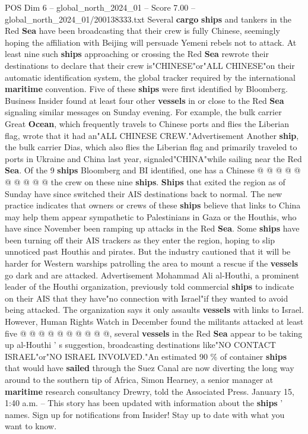 \begin{textsample}{POS Dim 6 – global\_north\_2024\_01 – Score 7.00 – global\_north\_2024\_01/200138333.txt}  \label{ex:f6_pos_119}
Several \textbf{cargo} \textbf{ships} and tankers in the Red \textbf{Sea} have been broadcasting that their crew is fully Chinese, seemingly hoping the affiliation with Beijing will persuade Yemeni rebels not to attack.
At least nine such \textbf{ships} approaching or crossing the Red \textbf{Sea} rewrote their destinations to declare that their crew is"CHINESE"or"ALL CHINESE"on their automatic identification system, the global tracker required by the international \textbf{maritime} convention.
Five of these \textbf{ships} were first identified by Bloomberg.
Business Insider found at least four other \textbf{vessels} in or close to the Red \textbf{Sea} signaling similar messages on Sunday evening.
For example, the bulk carrier Great \textbf{Ocean}, which frequently travels to Chinese ports and flies the Liberian flag, wrote that it had an"ALL CHINESE CREW."Advertisement Another \textbf{ship}, the bulk carrier Dias, which also flies the Liberian flag and primarily traveled to ports in Ukraine and China last year, signaled"CHINA"while sailing near the Red \textbf{Sea}.
Of the 9 \textbf{ships} Bloomberg and BI identified, one has a Chinese @ @ @ @ @ @ @ @ @ @ the crew on these nine \textbf{ships}. \textbf{Ships} that exited the region as of Sunday have since switched their AIS destinations back to normal.
The new practice indicates that owners or crews of these \textbf{ships} believe that links to China may help them appear sympathetic to Palestinians in Gaza or the Houthis, who have since November been ramping up attacks in the Red \textbf{Sea}.
Some \textbf{ships} have been turning off their AIS trackers as they enter the region, hoping to slip unnoticed past Houthis and pirates.
But the industry cautioned that it will be harder for Western warships patrolling the area to mount a rescue if the \textbf{vessels} go dark and are attacked.
Advertisement Mohammad Ali al-Houthi, a prominent leader of the Houthi organization, previously told commercial \textbf{ships} to indicate on their AIS that they have"no connection with Israel"if they wanted to avoid being attacked.
The organization says it only assaults \textbf{vessels} with links to Israel.
However, Human Rights Watch in December found the militants attacked at least five @ @ @ @ @ @ @ @ @ @, several \textbf{vessels} in the Red \textbf{Sea} appear to be taking up al-Houthi ' s suggestion, broadcasting destinations like"NO CONTACT ISRAEL"or"NO ISRAEL INVOLVED."An estimated 90 \% of container \textbf{ships} that would have \textbf{sailed} through the Suez Canal are now diverting the long way around to the southern tip of Africa, Simon Hearney, a senior manager at \textbf{maritime} research consultancy Drewry, told the Associated Press.
January 15, 1:40 a.m. -- This story has been updated with information about the \textbf{ships} ' names.
Sign up for notifications from Insider!
Stay up to date with what you want to know.

\end{textsample}
